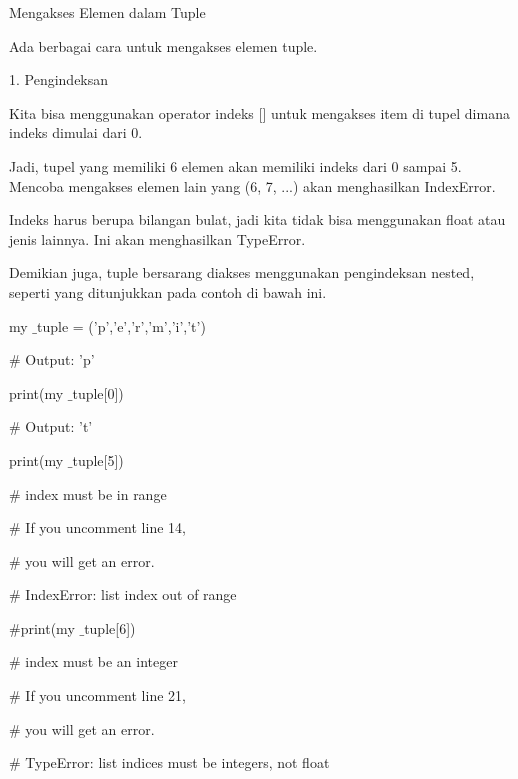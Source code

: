 Mengakses Elemen dalam Tuple \par
\vspace{12pt}
Ada berbagai cara untuk mengakses elemen tuple. \par
1. Pengindeksan \par
\vspace{12pt}
Kita bisa menggunakan operator indeks [] untuk mengakses item di tupel dimana indeks dimulai dari 0. \par
\vspace{12pt}
Jadi, tupel yang memiliki 6 elemen akan memiliki indeks dari 0 sampai 5. Mencoba mengakses elemen lain yang (6, 7, ...) akan menghasilkan IndexError. \par
\vspace{12pt}
Indeks harus berupa bilangan bulat, jadi kita tidak bisa menggunakan float atau jenis lainnya. Ini akan menghasilkan TypeError. \par
\vspace{12pt}
Demikian juga, tuple bersarang diakses menggunakan pengindeksan nested, seperti yang ditunjukkan pada contoh di bawah ini. \par
my $  \_  $tuple = ('p','e','r','m','i','t') \par
\vspace{12pt}
 $  \#  $ Output: 'p' \par
print(my $  \_  $tuple[0]) \par
\vspace{12pt}
 $  \#  $ Output: 't' \par
print(my $  \_  $tuple[5]) \par
\vspace{12pt}
 $  \#  $ index must be in range \par
 $  \#  $ If you uncomment line 14, \par
 $  \#  $ you will get an error. \par
 $  \#  $ IndexError: list index out of range \par
\vspace{12pt}
 $  \#  $print(my $  \_  $tuple[6]) \par
\vspace{12pt}
 $  \#  $ index must be an integer \par
 $  \#  $ If you uncomment line 21, \par
 $  \#  $ you will get an error. \par
 $  \#  $ TypeError: list indices must be integers, not float \par
\vspace{12pt}

